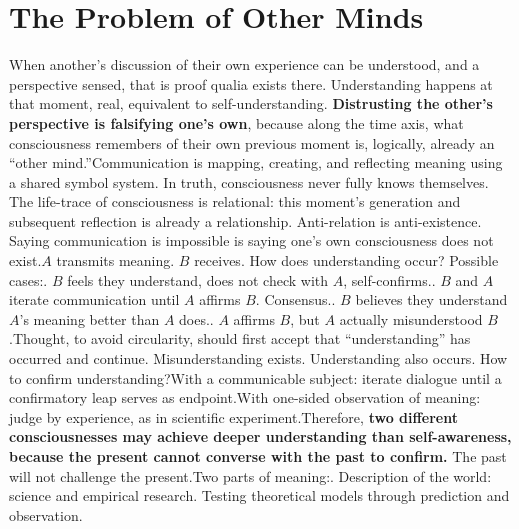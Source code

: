 \documentclass[11pt]{article}
\renewcommand{\\}[1][\mynewlineskip]{\oldnewline[#1]}
\begin{document}
\section{The Problem of Other Minds}
When another's discussion of their own experience can be understood, and a perspective sensed, that is proof qualia exists there. Understanding happens at that moment, real, equivalent to self-understanding. \textbf{Distrusting the other's perspective is falsifying one's own}, because along the time axis, what consciousness remembers of their own previous moment is, logically, already an ``other mind.''\\
Communication is mapping, creating, and reflecting meaning using a shared symbol system. In truth, consciousness never fully knows themselves. The life-trace of consciousness is relational: this moment's generation and subsequent reflection is already a relationship. Anti-relation is anti-existence. Saying communication is impossible is saying one's own consciousness does not exist.\\
$A$ transmits meaning. $B$ receives. How does understanding occur? Possible cases:\\
1. $B$ feels they understand, does not check with $A$, self-confirms.\\
2. $B$ and $A$ iterate communication until $A$ affirms $B$. Consensus.\\
3. $B$ believes they understand $A$'s meaning better than $A$ does.\\
4. $A$ affirms $B$, but $A$ actually misunderstood $B$.\\
Thought, to avoid circularity, should first accept that ``understanding'' has occurred and continue. Misunderstanding exists. Understanding also occurs. How to confirm understanding?\\
With a communicable subject: iterate dialogue until a confirmatory leap serves as endpoint.\\
With one-sided observation of meaning: judge by experience, as in scientific experiment.\\
Therefore, \textbf{two different consciousnesses may achieve deeper understanding than self-awareness, because the present cannot converse with the past to confirm. }The past will not challenge the present.\\
Two parts of meaning:\\
1. Description of the world: science and empirical research. Testing theoretical models through prediction and observation.\\
\end{document}
